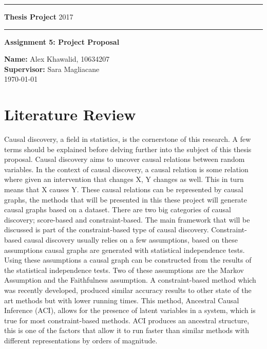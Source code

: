 \documentclass[11pt]{article}
\begin{document}
\rule{\textwidth}{1pt}

\textbf{Thesis Project} \hfill 2017
\rule{\textwidth}{1pt}
\vspace*{20pt}


\textbf{Assignment 5: Project Proposal}

\textbf{Name:} Alex Khawalid, 10634207\\
\textbf{Supervisor:} Sara Magliacane\\
\today

\section{Literature Review}
Causal discovery, a field in statistics, is the cornerstone of this research. A few terms should be explained before delving further into the subject of this thesis proposal.
Causal discovery aims to uncover causal relations between random variables. In the context of causal discovery, a causal relation is some relation where given an intervention that changes X, Y changes as well. This in turn means that X causes Y.
These causal relations can be represented by causal graphs, the methods that will be presented in this these project will generate causal graphs based on a dataset.
There are two big categories of causal discovery; score-based and constraint-based. The main framework that will be discussed is part of the constraint-based type of causal discovery. Constraint-based causal discovery usually relies on a few assumptions, based on these assumptions causal graphs are generated with statistical independence tests. Using these assumptions a causal graph can be constructed from the results of the statistical independence tests. Two of these assumptions are the Markov Assumption and the Faithfulness assumption.\cite{jci}
A constraint-based method which was recently developed, produced similar accuracy results to other state of the art methods but with lower running times. This method, Ancestral Causal Inference (ACI), allows for the presence of latent variables in a system, which is true for most constraint-based methods.  ACI produces an ancestral structure, this is one of the factors that allow it to run faster than similar methods with different representations by orders of magnitude. \cite{aci}
\end{document}

